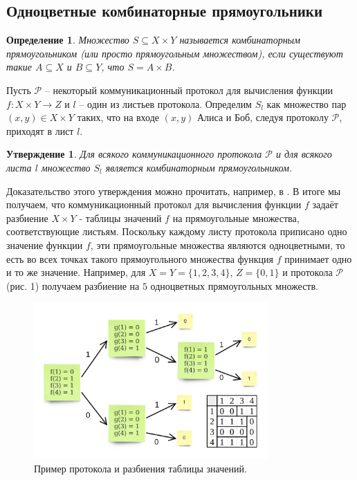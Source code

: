 \documentclass[a4paper]{article}
\newtheorem*{mdefinition}{Определение}
\newtheorem{mclaim}{Утверждение}[section]
\begin{document}
\subsection{Одноцветные комбинаторные прямоугольники}
\begin{mdefinition}
	Множество $S \subseteq X\times Y$ называется комбинаторным прямоугольником (или просто прямоугольным
	множеством), если существуют такие $A \subseteq X$ и $B \subseteq Y$, что $S = A\times B$.
\end{mdefinition}

Пусть $\mathcal{P}$ -- некоторый коммуникационный протокол для вычисления функции $f:X\times Y \rightarrow Z$ 
и $l$ -- один из листьев протокола. Определим $S_l$ как множество пар $(x, y) \in X\times Y$ таких, что 
на входе $(x,y)$ Алиса и Боб, следуя протоколу $\mathcal{P}$, приходят в лист $l$.

\begin{mclaim}
    Для всякого коммуникационного протокола $\mathcal{P}$ и для всякого листа $l$ множество $S_l$
    является комбинаторным прямоугольником. 
\end{mclaim}

Доказательство этого утверждения можно прочитать, например, в \cite{KushilevitzNisan}. В итоге мы получаем,
что коммуникационный протокол для вычисления функции $f$ задаёт разбиение $X\times Y$ - 
таблицы значений $f$ на прямоугольные множества, соответствующие листьям. Поскольку каждому
листу протокола приписано одно значение функции $f$, эти прямоугольные множества являются одноцветными,
то есть во всех точках такого прямоугольного множества функция $f$ принимает одно и то же значение.
Например, для $X = Y = \{1, 2, 3, 4\}$, $Z = \{0, 1\}$ и протокола $\mathcal{P}$ (рис. 1) получаем 
разбиение на $5$ одноцветных прямоугольных множеств. 

\begin{figure}
	\centering
	\includegraphics[width=0.8\textwidth]{images/protocol.png}
	\caption{Пример протокола и разбиения таблицы значений.}
\end{figure}
\end{document}
